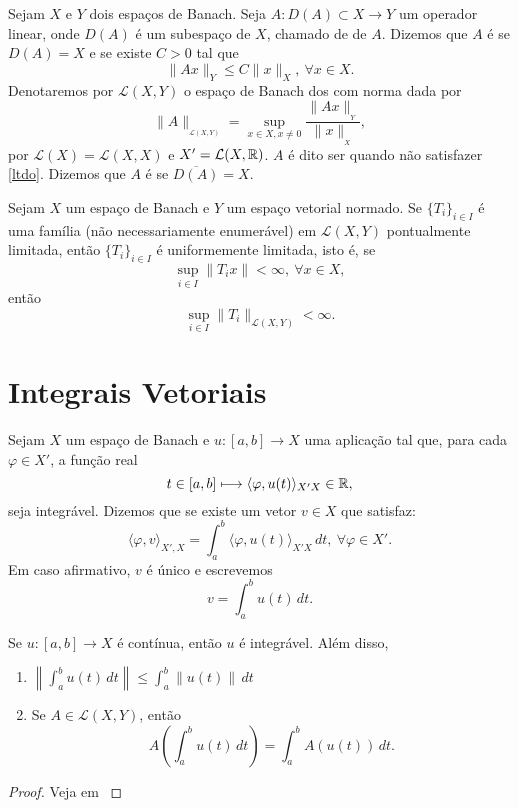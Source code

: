 Sejam $X$ e $Y$ dois espaços de Banach. Seja $A:D(A)\subset X\longrightarrow Y$ um operador linear,  onde $D(A)$ é um subespaço de $X$, chamado de  de $A$.
\medskip
Dizemos que $A$ é   se $D(A)=X$ e se existe  $C>0$ tal que 
\begin{equation}\label{ltdo}
\|Ax\|_{Y}\leq C\|x\|_X, \ \forall x\in X.
\end{equation}
Denotaremos por $\mathcal{L}(X,Y)$ o espaço de Banach dos  com norma dada por
\[\|A\|_{_{\mathcal{L}(X,Y)}}=\sup\limits_{x\in X, x\neq 0}\frac{\|Ax\|_{_Y}}{\|x\|_{_X}},\]
por $\mathcal{L}(X)=\mathcal{L}(X,X)$ e $X'=\mathcal{L}(X,\mathbb{R})$.
$A$ é dito ser   quando não satisfazer \eqref{ltdo}. Dizemos que $A$ é   se $\overline{D(A)}=X$.

\begin{theorem}\label{th-BS}
	Sejam $X$ um espaço de Banach e $Y$ um espaço vetorial normado. Se $\{T_i\}_{i\in I}$  é uma família (não necessariamente enumerável) em $\mathcal{L}(X,Y)$ pontualmente limitada, então $\{T_i\}_{i\in I}$ é uniformemente limitada, isto é, se 
	 \[\sup_{i\in I}\|T_ix\|< \infty,\ \forall x\in X,\] 
	 então
	 \[\sup_{i\in I}\|T_i\|_{\mathcal{L}(X,Y)}<\infty.\]
\end{theorem}

\section{Integrais Vetoriais}

\begin{definition}
Sejam $X$ um espaço de Banach e $u:[a,b]\longrightarrow X$ uma aplicação tal que, para cada $\varphi\in X'$,  a função real
\[t\in [a,b] \longmapsto \langle\varphi, u(t) \rangle_{X'X}\in \mathbb{R},\]
seja integrável. Dizemos que  se existe um vetor $v\in X$ que satisfaz:
\[\langle \varphi, v\rangle_{X',X}=\int_a^b \langle\varphi, u(t) \rangle_{X'X}\,dt,\ \forall \varphi\in X'.\]
Em caso afirmativo, $v$ é único e escrevemos
\[v=\int_a^b u(t)\,dt.\]
\end{definition}

\begin{proposition}\label{KthA3.2}
Se $u:[a,b]\longrightarrow X$ é {contínua}, então $u$ é integrável. Além disso, 
\begin{enumerate}
    \item $\displaystyle\left\|\int_a^b u(t)\,dt\right\|\leq \int_a^b \|u(t)\|\,dt$
    \item Se $A\in \mathcal{L}(X,Y)$, então
    \[ A\left(\int_a^b u(t)\,dt\right)=\int_a^b A(u(t))\,dt. \]
\end{enumerate}
\end{proposition}
\begin{proof}
Veja em \cite[Theorem A3.2]{kesavan2015topics}
\end{proof}

